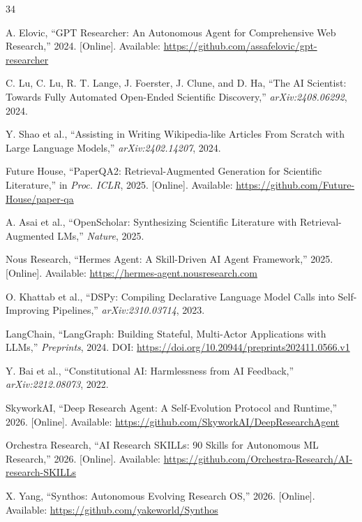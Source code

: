 \documentclass[review]{elsarticle}
\begin{document}
\begin{thebibliography}{34}

A. Elovic, ``GPT Researcher: An Autonomous Agent for Comprehensive Web Research,'' 2024. [Online]. Available: \url{https://github.com/assafelovic/gpt-researcher}

C. Lu, C. Lu, R. T. Lange, J. Foerster, J. Clune, and D. Ha, ``The AI Scientist: Towards Fully Automated Open-Ended Scientific Discovery,'' \textit{arXiv:2408.06292}, 2024.

Y. Shao et al., ``Assisting in Writing Wikipedia-like Articles From Scratch with Large Language Models,'' \textit{arXiv:2402.14207}, 2024.

Future House, ``PaperQA2: Retrieval-Augmented Generation for Scientific Literature,'' in \textit{Proc. ICLR}, 2025. [Online]. Available: \url{https://github.com/Future-House/paper-qa}

A. Asai et al., ``OpenScholar: Synthesizing Scientific Literature with Retrieval-Augmented LMs,'' \textit{Nature}, 2025.

Nous Research, ``Hermes Agent: A Skill-Driven AI Agent Framework,'' 2025. [Online]. Available: \url{https://hermes-agent.nousresearch.com}

O. Khattab et al., ``DSPy: Compiling Declarative Language Model Calls into Self-Improving Pipelines,'' \textit{arXiv:2310.03714}, 2023.

LangChain, ``LangGraph: Building Stateful, Multi-Actor Applications with LLMs,'' \textit{Preprints}, 2024. DOI: \url{https://doi.org/10.20944/preprints202411.0566.v1}

Y. Bai et al., ``Constitutional AI: Harmlessness from AI Feedback,'' \textit{arXiv:2212.08073}, 2022.

SkyworkAI, ``Deep Research Agent: A Self-Evolution Protocol and Runtime,'' 2026. [Online]. Available: \url{https://github.com/SkyworkAI/DeepResearchAgent}

Orchestra Research, ``AI Research SKILLs: 90 Skills for Autonomous ML Research,'' 2026. [Online]. Available: \url{https://github.com/Orchestra-Research/AI-research-SKILLs}

X. Yang, ``Synthos: Autonomous Evolving Research OS,'' 2026. [Online]. Available: \url{https://github.com/yakeworld/Synthos}


\end{thebibliography}
\end{document}
